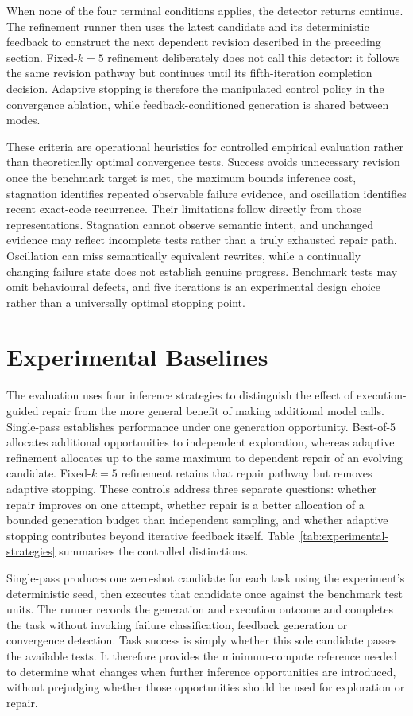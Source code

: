 When none of the four terminal conditions applies, the detector returns continue. The refinement runner then uses the latest candidate and its deterministic feedback to construct the next dependent revision described in the preceding section. Fixed-$k=5$ refinement deliberately does not call this detector: it follows the same revision pathway but continues until its fifth-iteration completion decision. Adaptive stopping is therefore the manipulated control policy in the convergence ablation, while feedback-conditioned generation is shared between modes.

These criteria are operational heuristics for controlled empirical evaluation rather than theoretically optimal convergence tests. Success avoids unnecessary revision once the benchmark target is met, the maximum bounds inference cost, stagnation identifies repeated observable failure evidence, and oscillation identifies recent exact-code recurrence. Their limitations follow directly from those representations. Stagnation cannot observe semantic intent, and unchanged evidence may reflect incomplete tests rather than a truly exhausted repair path. Oscillation can miss semantically equivalent rewrites, while a continually changing failure state does not establish genuine progress. Benchmark tests may omit behavioural defects, and five iterations is an experimental design choice rather than a universally optimal stopping point.

\section{Experimental Baselines}

The evaluation uses four inference strategies to distinguish the effect of execution-guided repair from the more general benefit of making additional model calls. Single-pass establishes performance under one generation opportunity. Best-of-5 allocates additional opportunities to independent exploration, whereas adaptive refinement allocates up to the same maximum to dependent repair of an evolving candidate. Fixed-$k=5$ refinement retains that repair pathway but removes adaptive stopping. These controls address three separate questions: whether repair improves on one attempt, whether repair is a better allocation of a bounded generation budget than independent sampling, and whether adaptive stopping contributes beyond iterative feedback itself. Table~\ref{tab:experimental-strategies} summarises the controlled distinctions.

Single-pass produces one zero-shot candidate for each task using the experiment's deterministic seed, then executes that candidate once against the benchmark test units. The runner records the generation and execution outcome and completes the task without invoking failure classification, feedback generation or convergence detection. Task success is simply whether this sole candidate passes the available tests. It therefore provides the minimum-compute reference needed to determine what changes when further inference opportunities are introduced, without prejudging whether those opportunities should be used for exploration or repair.

